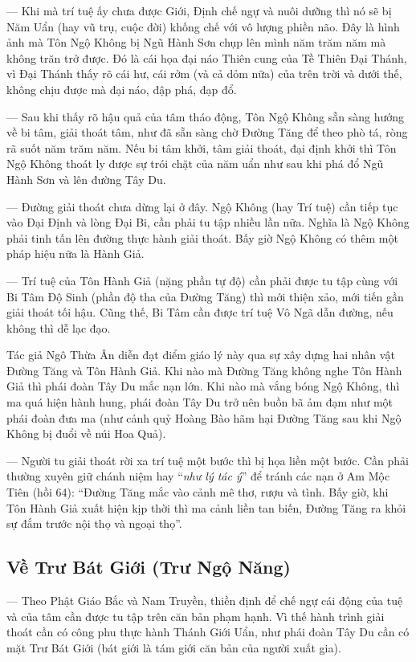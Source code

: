 --- Khi mà trí tuệ ấy chưa được Giới, Định chế ngự và nuôi dưỡng thì nó sẽ bị Năm Uẩn (hay vũ trụ, cuộc đời) khống chế với vô lượng phiền não. Đây là hình ảnh mà Tôn Ngộ Không bị Ngũ Hành Sơn chụp lên mình năm trăm năm mà không trăn trở được. Đó là cái họa đại náo Thiên cung của Tề Thiên Đại Thánh, vì Đại Thánh thấy rõ cái hư, cái rởm (và cả dỏm nữa) của trên trời và dưới thế, không chịu được mà đại náo, đập phá, đạp đổ.

--- Sau khi thấy rõ hậu quả của tâm tháo động, Tôn Ngộ Không sẵn sàng hướng về bi tâm, giải thoát tâm, như đã sẵn sàng chờ Đường Tăng để theo phò tá, ròng rã suốt năm trăm năm. Nếu bi tâm khởi, tâm giải thoát, đại định khởi thì Tôn Ngộ Không thoát ly được sự trói chặt của năm uẩn như sau khi phá đổ Ngũ Hành Sơn và lên đường Tây Du.

--- Đường giải thoát chưa dừng lại ở đây. Ngộ Không (hay Trí tuệ) cần tiếp tục vào Đại Định và lòng Đại Bi, cần phải tu tập nhiều lần nữa. Nghĩa là Ngộ Không phải tinh tấn lên đường thực hành giải thoát. Bấy giờ Ngộ Không có thêm một pháp hiệu nữa là Hành Giả.

--- Trí tuệ của Tôn Hành Giả (nặng phần tự độ) cần phải được tu tập cùng với Bi Tâm Độ Sinh (phần độ tha của Đường Tăng) thì mới thiện xảo, mới tiến gần giải thoát tối hậu. Cũng thế, Bi Tâm cần được trí tuệ Vô Ngã dẫn đường, nếu không thì dễ lạc đạo.

Tác giả Ngô Thừa Ân diễn đạt điểm giáo lý này qua sự xây dựng hai nhân vật Đường Tăng và Tôn Hành Giả. Khi nào mà Đường Tăng không nghe Tôn Hành Giả thì phái đoàn Tây Du mắc nạn lớn. Khi nào mà vắng bóng Ngộ Không, thì ma quá hiện hành hung, phái đoàn Tây Du trở nên  buồn bã ảm đạm như một phái đoàn đưa ma (như cảnh quỷ Hoàng Bào hãm hại Đường Tăng sau khi Ngộ Không bị đuổi về núi Hoa Quả).

--- Người tu giải thoát rời xa trí tuệ một bước thì bị họa liền một bước. Cần phải thường xuyên giữ chánh niệm hay ``\emph{như lý tác ý}'' để tránh các nạn ở Am Mộc Tiên (hồi 64): ``Đường Tăng mắc vào cảnh mê thơ, rượu và tình. Bấy giờ, khi Tôn Hành Giả xuất hiện kịp thời thì ma cảnh liền tan biến, Đường Tăng ra khỏi sự đắm trước nội thọ và ngoại thọ''.

\subsection{Về Trư Bát Giới (Trư Ngộ Năng)} %
\label{sub:ve_tru_bat_gioi}

--- Theo Phật Giáo Bắc và Nam Truyền, thiền định để chế ngự cái động của tuệ và của tâm cần được tu tập trên căn bản phạm hạnh. Vì thế hành trình giải thoát cần có công phu thực hành Thánh Giới Uẩn, như phái đoàn Tây Du cần có mặt Trư Bát Giới (bát giới là tám giới căn bản của người xuất gia).

